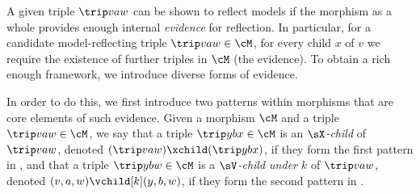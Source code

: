 \begin{comment}
\todo[inline]{In fact, we have two versions of model reflection; it currently is unclear which is the ``better''. The difference is that (ordinary) reflection does not impose any requirement on the witnesses, whereas strong reflection requires that the witness of the reflected model is itself a reflected witness of the original model.}
\begin{definition}[strong model reflection]
Let $\cM\of \cT\to\cU$ be a morphism and let $\trip vaw\in\cM$.
\begin{itemize}[topsep=\itemsep]
\item $a$ \emph{reflects a $\hat w$-model $g$ with witness $h$} if $a\I;g\sat \hat v$ with witness $a\P;h$.
	
\item $a$ \emph{strongly reflects models} if $a$ reflects all $\hat w$-model/witness pairs.
		
\item $\cM$ strongly reflects models if $\rtof\cM$ reflects models.
\end{itemize}
\end{definition}
%
\todo[inline]{
The first of these, ``ordinary'' reflection, is the property we are really after; at some point we thought that strong reflection would be necessary for building an inductive proof, but currently that seems not to be the case. If that is born out, we can forget about strong reflection.
}
\end{comment}
%
A given triple $\trip vaw$ can be shown to reflect models if the morphism as a whole provides enough internal \emph{evidence} for reflection. In particular, for a candidate model-reflecting triple $\trip vaw\in \cM$, for every child $x$ of $v$ we require the existence of further triples in $\cM$ (the evidence). To obtain a rich enough framework, we introduce diverse forms of evidence.

In order to do this, we first introduce two patterns within morphisms that are core elements of such evidence. Given a morphism $\cM$ and a triple $\trip vaw\in\cM$, we say that a triple $\trip ybx\in\cM$ is an \emph{$\sX$-child} of $\trip vaw$, denoted $(\trip vaw)\xchild (\trip ybx)$, if they form the first pattern in , and that a triple $\trip ybw\in \cM$ is a \emph{$\sV$-child under $k$} of $\trip vaw$, denoted $(v,a,w)\vchild[k] (y,b,w)$, if they form the second pattern in .

